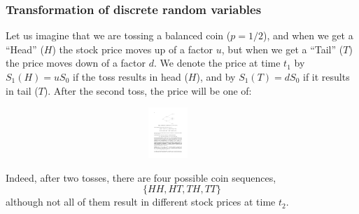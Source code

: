 \documentclass[notes=show,smaller,handout]{beamer}
\begin{document}
\begin{frame}%
\frametitle{Transformation of discrete random variables}
\begin{example} 

Let us imagine that we are tossing a balanced coin ($p=1/2$), and when we get a ``Head'' ($H$) the stock price moves up of a factor $u$, but when we get a ``Tail'' ($T$) the price moves down of a factor $d$. We denote the price at time $t_1$  by $S_1(H)=u S_0 $ if the toss results in head ($H$), and by $S_1(T)=d S_0 $  if it results in tail ($T$). After the second toss, the price will be one of:
\begin{figure}[ptb]\centering
\includegraphics[height=0.75in, width=4in]{Shreve_Bin.pdf}%
\end{figure}%
Indeed, after two tosses, there are four possible coin sequences, 
$$
\{HH,HT,TH,TT\}
$$
although not all of them result in different stock prices at time  $t_2$.
%
\end{example}
\end{frame}%
\end{document}
